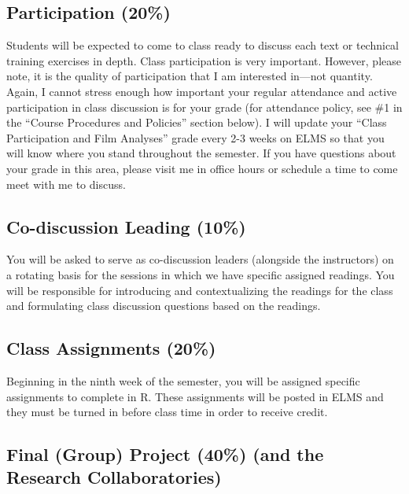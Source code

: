 \documentclass[
]{book}
\begin{document}
\hypertarget{participation-20}{%
\subsection{Participation (20\%)}\label{participation-20}}

Students will be expected to come to class ready to discuss each text or technical training exercises in depth. Class participation is very important. However, please note, it is the quality of participation that I am interested in---not quantity. Again, I cannot stress enough how important your regular attendance and active participation in class discussion is for your grade (for attendance policy, see \#1 in the ``Course Procedures and Policies'' section below). I will update your ``Class Participation and Film Analyses'' grade every 2-3 weeks on ELMS so that you will know where you stand throughout the semester. If you have questions about your grade in this area, please visit me in office hours or schedule a time to come meet with me to discuss.

\hypertarget{co-discussion-leading-10}{%
\subsection{Co-discussion Leading (10\%)}\label{co-discussion-leading-10}}

You will be asked to serve as co-discussion leaders (alongside the instructors) on a rotating basis for the sessions in which we have specific assigned readings. You will be responsible for introducing and contextualizing the readings for the class and formulating class discussion questions based on the readings.

\hypertarget{class-assignments-20}{%
\subsection{Class Assignments (20\%)}\label{class-assignments-20}}

Beginning in the ninth week of the semester, you will be assigned specific assignments to complete in R. These assignments will be posted in ELMS and they must be turned in before class time in order to receive credit.

\hypertarget{final-group-project-40-and-the-research-collaboratories}{%
\subsection{Final (Group) Project (40\%) (and the Research Collaboratories)}\label{final-group-project-40-and-the-research-collaboratories}}
\end{document}
